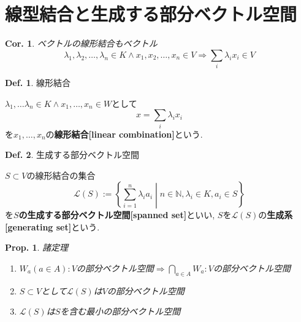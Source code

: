 \documentclass[a4paper,10pt,report]{amsart}
\theoremstyle{plain}
\newtheorem{cor}{Cor.}[section]
\newtheorem{prop}{Prop.}[section]
\theoremstyle{definition}
\newtheorem{defn}{Def.}[section]
\theoremstyle{remark}
\begin{document}
\section{線型結合と生成する部分ベクトル空間}
\begin{leftbar}
    \begin{cor}\label{cor::a_linear_combination_of_vectors_is_also_a_vector}ベクトルの線形結合もベクトル
        \begin{equation}
           \lambda_{1},\lambda_{2},\ldots,\lambda_{n}\in K\wedge
           x_{1},x_{2},\ldots,x_{n}\in V\Rightarrow \sum_{i}\lambda_{i}x_{i}\in V
        \end{equation}
    \end{cor}
\end{leftbar}
\begin{leftbar}
    \begin{defn}線形結合\par
        \(\lambda_{1},\ldots\lambda_{n}\in K\wedge x_{1},\ldots,x_{n}\in W\)として
        \begin{equation}
            x=\sum_{i}\lambda_{i}x_{i}
        \end{equation}
        を\(x_{1},\ldots,x_{n}\)の\textbf{線形結合[linear combination]}という.
    \end{defn}
\end{leftbar}
\begin{leftbar}
    \begin{defn}生成する部分ベクトル空間\par
        \(S\subset V\)の線形結合の集合
        \begin{equation}
            \mathcal{L}(S):=\left \{\sum_{i=1}^{n}\lambda_{i}a_{i}\middle|n\in\mathbb{N},\lambda_{i}\in K,a_{i}\in S\right \}
        \end{equation}
        を\textbf{\(S\)の生成する部分ベクトル空間[spanned set]}といい, 
        \(S\)を\(\mathcal{L}(S)\)の\textbf{生成系[generating set]}という. 
    \end{defn}
\end{leftbar}
\begin{leftbar}
    \begin{prop}諸定理
        \begin{enumerate}
            \item \(W_{a}(a\in A):V\)の部分ベクトル空間\(\Rightarrow\bigcap_{a\in A}W_{a}:V\)の部分ベクトル空間
            \item \(S\subset V\)として\(\mathcal{L}(S)\)は\(V\)の部分ベクトル空間
            \item \(\mathcal{L}(S)\)は\(S\)を含む最小の部分ベクトル空間
        \end{enumerate}
    \end{prop}
\end{leftbar}
\end{document}
